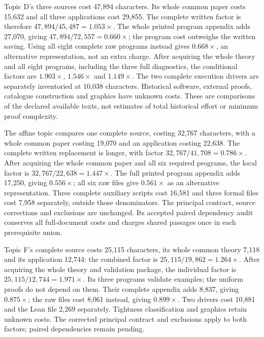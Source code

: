 \documentclass[11pt,a4paper]{article}
\begin{document}
Topic D's three sources cost 47,894 characters. Its whole common paper
costs 15,632 and all three applications cost 29,855. The complete written
factor is therefore $47{,}894/45{,}487=1.053\times$. The whole printed
program appendix adds 27,070, giving $47{,}894/72{,}557=0.660\times$;
the program cost outweighs the written saving. Using all eight complete
raw programs instead gives $0.668\times$, an alternative representation,
not an extra charge. After acquiring the whole theory and all eight
programs, including the three full diagnostics, the conditional factors
are $1.903\times$, $1.546\times$ and $1.149\times$. The two complete
execution drivers are separately inventoried at 10,038 characters.
Historical software, external proofs, catalogue construction and graphics
have unknown costs. These are comparisons of the declared available texts,
not estimates of total historical effort or minimum proof complexity.

The affine topic compares one complete source, costing 32,767 characters,
with a whole common paper costing 19,070 and an application costing 22,638.
The complete written replacement is longer, with factor
$32{,}767/41{,}708=0.786\times$. After acquiring the whole common paper
and all six required programs, the local factor is
$32{,}767/22{,}638=1.447\times$.
The full printed program appendix adds 17,250, giving $0.556\times$;
all six raw files give $0.561\times$ as an alternative representation.
Three complete auxiliary scripts cost 16,581 and three formal files cost
7,958 separately, outside those denominators. The principal contract,
source corrections and exclusions are unchanged. Its accepted paired
dependency audit conserves all full-document costs and charges shared
passages once in each prerequisite union.

Topic F's complete source costs 25,115 characters, its whole common theory
7,118 and its application 12,744: the combined factor is
$25{,}115/19{,}862=1.264\times$. After acquiring the whole theory and
validation package, the individual factor is $25{,}115/12{,}744=1.971\times$.
Its three programs validate examples; the uniform proofs do not depend on
them. Their complete appendix adds 8,837, giving $0.875\times$; the raw files
cost 8,061 instead, giving $0.899\times$. Two drivers cost 10,881 and the
Lean file 2,269 separately. Tightness classification and graphics retain
unknown costs. The corrected principal contract and exclusions apply to
both factors; paired dependencies remain pending.
\end{document}
